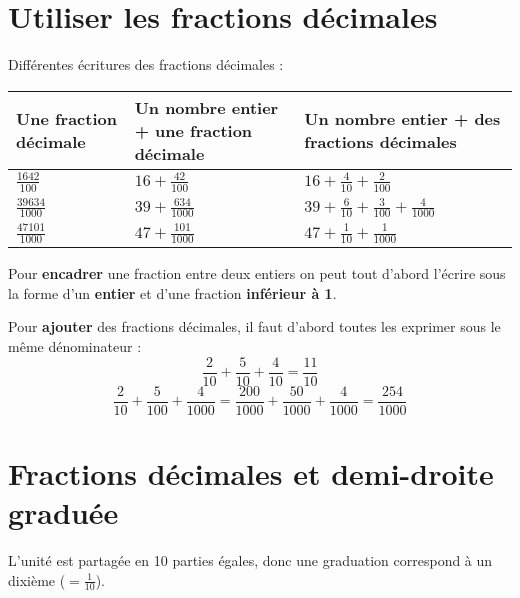 \begin{pageCours}

\section{Utiliser les fractions décimales}

\begin{Mt}
Différentes écritures des fractions décimales :
\begin{center}
\begin{tabular}{|M{5cm}|M{5cm}|M{5cm}|}\hline
Une fraction décimale & Un nombre entier + une fraction décimale & Un nombre entier + des fractions décimales \\\hline 
$\frac{1642}{100}$ & $16+\frac{42}{100}$ & $16+\frac{4}{10}+\frac{2}{100}$ \\\hline
$\frac{39634}{1000}$ & $39+\frac{634}{1000}$ & $39+\frac{6}{10}+\frac{3}{100}+\frac{4}{1000}$ \\\hline
$\frac{47101}{1000}$ & $47+\frac{101}{1000}$ & $47+\frac{1}{10}+\frac{1}{1000}$ \\\hline
\end{tabular}
\end{center}
\end{Mt}



\begin{Mt}
Pour \textbf{encadrer} une fraction entre deux entiers on peut tout d'abord l'écrire sous la forme d'un \textbf{entier} et d'une fraction \textbf{inférieur à 1}.
\end{Mt}


\begin{Mt}
Pour \textbf{ajouter} des fractions décimales, il faut d'abord toutes les exprimer sous le même dénominateur :
\[\frac{2}{10}+\frac{5}{10}+\frac{4}{10}=\frac{11}{10}\]
\[\frac{2}{10}+\frac{5}{100}+\frac{4}{1000}=\frac{200}{1000}+\frac{50}{1000}+\frac{4}{1000}=\frac{254}{1000}\]
\end{Mt}





\section{Fractions décimales et demi-droite graduée}

\begin{Mt}
L'unité est partagée en 10 parties égales, donc une graduation correspond à un dixième ($=\frac{1}{10}$).


\end{Mt}
\end{pageCours}

